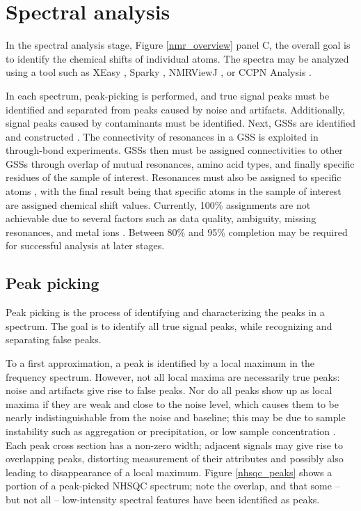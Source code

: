 \section{Spectral analysis}

In the spectral analysis stage, Figure \ref{nmr_overview} panel C,
the overall goal is to identify the chemical shifts of individual atoms.
The spectra may be analyzed using a tool such as XEasy \cite{xeasy}, 
Sparky \cite{sparky}, NMRViewJ \cite{nmrviewj}, or CCPN Analysis \cite{ccpn}.  

In each spectrum, peak-picking is performed, and true signal peaks must 
be identified and separated from peaks caused by noise and artifacts.  
Additionally, signal peaks caused by contaminants must be identified.  
Next, GSSs are identified and constructed \cite{ccpn}. 
The connectivity of resonances in a GSS is exploited 
in through-bond experiments.  GSSs then must be assigned 
connectivities to other GSSs through overlap of mutual resonances, 
amino acid types, and finally specific residues of the sample of interest. 
Resonances must also be assigned to specific atoms \cite{ccpn}, 
with the final result being that specific atoms in the sample of interest 
are assigned chemical shift values.  Currently, 100\% assignments are not 
achievable due to several factors such as data quality, ambiguity,
missing resonances, and metal ions \cite{guerry2011automated}.
Between 80\% and 95\% completion may be required \cite{williamson2009automated}
for successful analysis at later stages.

\subsection*{Peak picking}
Peak picking is the process of identifying and characterizing the peaks in 
a spectrum.  The goal is to identify all true signal peaks, while recognizing
and separating false peaks.

To a first approximation, a peak is identified by a local maximum in the 
frequency spectrum.  However, not all local maxima are necessarily true
peaks: noise and artifacts give rise to false peaks.  Nor do all peaks show 
up as local maxima if 
they are weak and close to the noise level, which causes them 
to be nearly indistinguishable from the noise and baseline; this may be due to 
sample instability such as aggregation or precipitation, or low sample 
concentration \cite{picky, munin, korzhnev2001munin, apart, autopsy, pine}
\cite{williamson2009automated, guntert2009automated, altieri2004automation,
baran2004automated}.
Each peak cross section has a non-zero width; adjacent signals may give rise
to overlapping peaks, distorting measurement of their attributes and possibly
also leading to disappearance of a local maximum.
Figure \ref{nhsqc_peaks} shows a portion of a peak-picked
NHSQC spectrum; note the overlap, and that some -- but not
all -- low-intensity spectral features have been identified as peaks.

